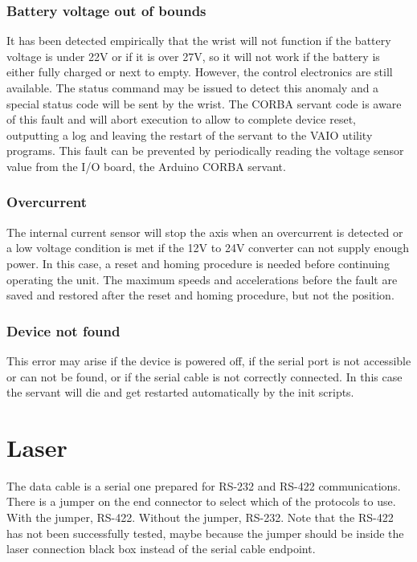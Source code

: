 \subsubsection{Battery voltage out of bounds}
It has been detected empirically that the wrist will not function if the battery
voltage is under 22V or if it is over 27V, so it will not work if the battery is
either fully charged or next to empty. However, the control electronics are
still available. The status command may be issued to detect this anomaly and a
special status code will be sent by the wrist. The CORBA servant code is aware
of this fault and will abort execution to allow to complete device reset,
outputting a log and leaving the restart of the servant to the VAIO utility
programs. This fault can be prevented by periodically reading
the voltage sensor value from the I/O board, the Arduino CORBA servant.
\subsubsection{Overcurrent}
The internal current sensor will stop the axis when an overcurrent is detected
or a low voltage condition is met if the 12V to 24V converter can not supply
enough power. In this case, a reset and homing procedure is needed before
continuing operating the unit. The maximum speeds and accelerations before the
fault are saved and restored after the reset and homing procedure, but not the
position.
\subsubsection{Device not found}
This error may arise if the device is powered off, if the serial port is not
accessible or can not be found, or if the serial cable is not correctly connected.
In this case the servant will die and get restarted automatically by the init scripts.


\section{Laser}
\label{sec:devmanual_laser}

The data cable is a serial one prepared for RS-232 and RS-422 communications.
There is a jumper on the end connector to select which of the protocols to use.
With the jumper, RS-422. Without the jumper, RS-232. Note that the RS-422 has
not been successfully tested, maybe because the jumper should be inside the laser
connection black box instead of the serial cable endpoint.

